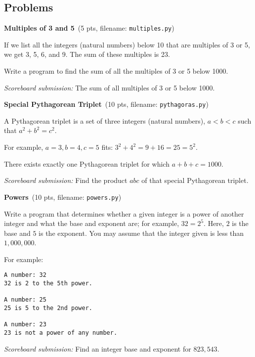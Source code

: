 \documentclass[11pt]{cselabheader}
\newcommand{\cop}[3]{\textbf{#1}~(#2 pts, filename: \texttt{#3})\quad}
\theoremstyle{plain}
\begin{document}
\pagebreak
\subsection{Problems}

\begin{enumerate}
	\item \cop{Multiples of 3 and 5}{5}{multiples.py}

		If we list all the integers (natural numbers) below 10 that are
		multiples of 3 or 5, we get 3, 5, 6, and 9. The sum of these multiples
		is 23.

		Write a program to find the sum of all the multiples of 3 or 5 below
		1000.

		\textit{Scoreboard submission:} The sum of all multiples of 3 or 5
		below 1000.

	\item \cop{Special Pythagorean Triplet}{10}{pythagoras.py}

		A Pythagorean triplet is a set of three integers (natural numbers), $a
		< b < c$ such that $a^2 + b^2 = c^2$.

		For example, $a = 3, b = 4, c = 5$ fits: $3^2 + 4^2 = 9 + 16 = 25 =
		5^2$.

		There exists exactly one Pythagorean triplet for which $a + b + c =
		1000$.

		\textit{Scoreboard submission:} Find the product $abc$ of that special
		Pythagorean triplet.

	\item \cop{Powers}{10}{powers.py}

		Write a program that determines whether a given integer is a power of
		another integer and what the base and exponent are; for example, $32 = 
		2^5$. Here, $2$ is the base and $5$ is the exponent. You may assume 
		that the integer given is less than $1,000,000$. 

		For example:
		\begin{lstlisting}[style=bash]
A number: 32
32 is 2 to the 5th power.

A number: 25
25 is 5 to the 2nd power.

A number: 23
23 is not a power of any number.
		\end{lstlisting}

		\textit{Scoreboard submission:} Find an integer base and exponent for 
		$823,543$. %


\end{enumerate}
\end{document}
